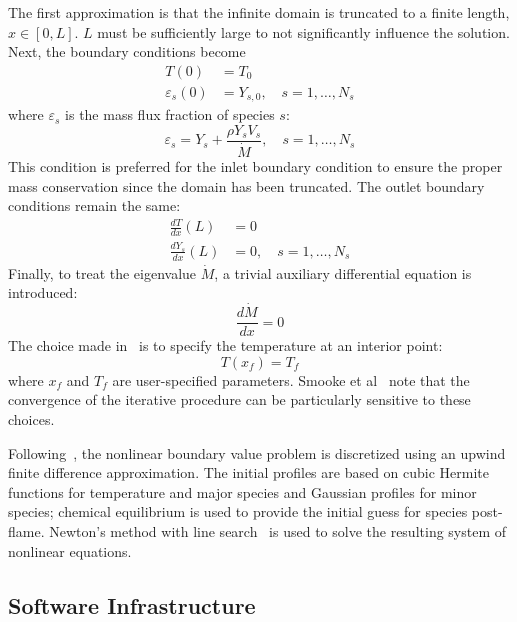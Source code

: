 The first approximation is that the infinite domain is truncated to a
finite length, $x\in[0,L]$. $L$ must be sufficiently large to not
significantly influence the solution. Next, the boundary conditions
become
%
\begin{align}
  T(0) &= T_0 \\
  \varepsilon_s(0) &= Y_{s,0}, \quad s = 1, \dots, N_s
\end{align}
%
where $\varepsilon_s$ is the mass flux fraction of species $s$:
%
\begin{equation}
  \varepsilon_s = Y_s + \frac{\rho Y_s V_s}{\dot{M}}, \quad s = 1, \dots, N_s
\end{equation}
%
This condition is preferred for the inlet boundary condition to ensure
the proper mass conservation since the domain has been truncated.
The outlet boundary conditions remain the same:
%
\begin{align}
  \frac{dT}{dx}(L) &= 0 \\
  \frac{dY_s}{dx}(L) &= 0, \quad s = 1, \dots, N_s
\end{align}
%
Finally, to treat the eigenvalue $\dot{M}$, a trivial auxiliary
differential equation is introduced:
%
\begin{equation}
  \frac{d\dot{M}}{dx} = 0
\end{equation}
%
The choice made in~\cite{Smooke} is to specify the temperature at an
interior point:
%
\begin{equation}
  T(x_f) = T_f
\end{equation}
%
where $x_f$ and $T_f$ are user-specified parameters. Smooke et
al~\cite{Smooke} note that the convergence of the iterative procedure
can be particularly sensitive to these choices.

Following~\cite{Smooke}, the nonlinear boundary value problem is discretized using an upwind
finite difference approximation. The initial profiles are based on
cubic Hermite functions for temperature and major species and Gaussian
profiles for minor species; chemical equilibrium is used to provide
the initial guess for species post-flame. Newton's method with line
search~\cite{NocedalWright1999} is used to solve the resulting system
of nonlinear equations.

\subsection{Software Infrastructure}

